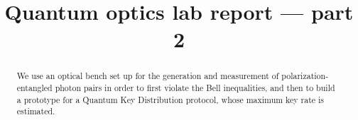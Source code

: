\documentclass[11pt]{article}
\title{Quantum optics lab report --- part 2}
\begin{document}
\maketitle

\begin{abstract}
We use an optical bench set up for the generation and measurement of polarization-entangled photon pairs in order to first violate the Bell inequalities, and then to build a prototype for a Quantum Key Distribution protocol, whose maximum key rate is estimated. 
\end{abstract}





% 

\printbibliography
\end{document}
